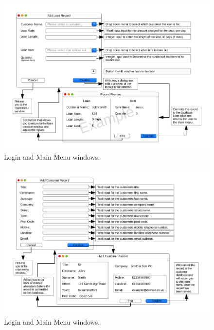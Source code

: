 \begin{landscape}
\newpage

\begin{figure}[H]
    \begin{center}
        \includegraphics[width=500px]{./Design/user_interface/Add_loan_record_interface.pdf}
    \end{center}
    \caption{Login and Main Menu windows.} \label{fig:print_function_result}
\end{figure}

\newpage

\begin{figure}[H]
    \begin{center}
        \includegraphics[width=500px]{./Design/user_interface/Add_customer_record_interface.pdf}
    \end{center}
    \caption{Login and Main Menu windows.} \label{fig:print_function_result}
\end{figure}

\end{landscape}

